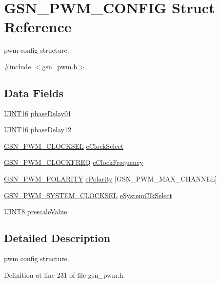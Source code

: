 \hypertarget{a00181}{
\section{GSN\_\-PWM\_\-CONFIG Struct Reference}
\label{a00181}
}


pwm config structure.  




{\ttfamily \#include $<$gsn\_\-pwm.h$>$}

\subsection*{Data Fields}
\begin{DoxyCompactItemize}
\item 
\hyperlink{a00660_ga09f1a1fb2293e33483cc8d44aefb1eb1}{UINT16} \hyperlink{a00181_a8de18931724a643f1df1baf94b681872}{phaseDelay01}
\item 
\hyperlink{a00660_ga09f1a1fb2293e33483cc8d44aefb1eb1}{UINT16} \hyperlink{a00181_ad6d3212158daea01137f525cd6890ad2}{phaseDelay12}
\item 
\hyperlink{a00650_gafda5110eb592af71b799ed22c7ebf902}{GSN\_\-PWM\_\-CLOCKSEL} \hyperlink{a00181_a5f9d20354a07d3b9705024ecca50bb08}{eClockSelect}
\item 
\hyperlink{a00650_ga52371d0feb719879e34584cfa2ef6733}{GSN\_\-PWM\_\-CLOCKFREQ} \hyperlink{a00181_aeb48843c5c889d4548415c812e319d89}{eClockFrequency}
\item 
\hyperlink{a00650_gaea0350ae8992c56b4a1bad6bc7ad5de1}{GSN\_\-PWM\_\-POLARITY} \hyperlink{a00181_a4debdbc31bfcc2a8fbdc335bd829ddda}{ePolarity} \mbox{[}GSN\_\-PWM\_\-MAX\_\-CHANNEL\mbox{]}
\item 
\hyperlink{a00650_ga110e33b4ac34f5c1b7e1f1e3b27d2281}{GSN\_\-PWM\_\-SYSTEM\_\-CLOCKSEL} \hyperlink{a00181_a18088918d77b0fe6660b6720310157fa}{eSystemClkSelect}
\item 
\hyperlink{a00660_gab27e9918b538ce9d8ca692479b375b6a}{UINT8} \hyperlink{a00181_af00c7cbcd38a18bbcac043542f5383dd}{prescaleValue}
\end{DoxyCompactItemize}


\subsection{Detailed Description}
pwm config structure. 

Definition at line 231 of file gsn\_\-pwm.h.




